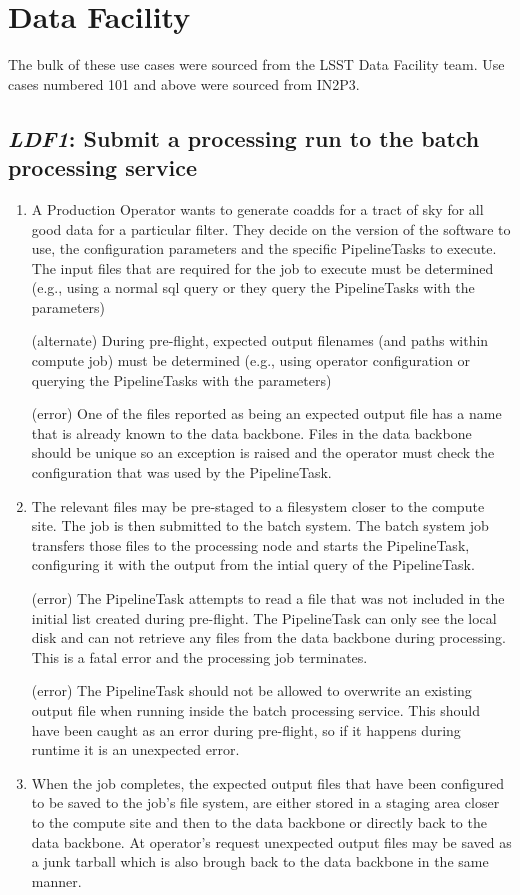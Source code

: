 \documentclass[DM,toc,lsstdraft]{lsstdoc}
\newcommand{\usecase}[3]{%
\subsection{\emph{#1}: #2}
\label{use:#1}
\begin{enumerate}[label=\alph*.]
#3
\end{enumerate}
}
\begin{document}
\section{Data Facility}

The bulk of these use cases were sourced from the LSST Data Facility team.
Use cases numbered 101 and above were sourced from IN2P3.

\usecase{LDF1}{Submit a processing run to the batch processing service}{%

\item
A Production Operator wants to generate coadds for a tract of sky for all good data for a particular filter.
They decide on the version of the software to use, the configuration parameters and the specific PipelineTasks to execute.
The input files that are required for the job to execute must be determined (e.g., using a normal sql query or they query the PipelineTasks with the parameters)

(alternate)
During pre-flight, expected output filenames (and paths within compute job) must be determined (e.g., using operator configuration or querying the PipelineTasks with the parameters)

(error)
One of the files reported as being an expected output file has a name that is already known to the data backbone.
Files in the data backbone should be unique so an exception is raised and the operator must check the configuration that was used by the PipelineTask.

\item
The relevant files may be pre-staged to a filesystem closer to the compute site.
The job is then submitted to the batch system.
The batch system job transfers those files to the processing node and starts the PipelineTask, configuring it with the output from the intial query of the PipelineTask.

(error)
The PipelineTask attempts to read a file that was not included in the initial list created during pre-flight.
The PipelineTask can only see the local disk and can not retrieve any files from the data backbone during processing.
This is a fatal error and the processing job terminates.

(error)
The PipelineTask should not be allowed to overwrite an existing output file when running inside the batch processing service.
This should have been caught as an error during pre-flight, so if it happens during runtime it is an unexpected error.

\item
When the job completes, the expected output files that have been configured to be saved to the job's file system, are either stored in a staging area closer to the compute site and then to the data backbone or directly back to the data backbone.
At operator's request unexpected output files may be saved as a junk tarball which is also brough back to the data backbone in the same manner.

}
\end{document}
